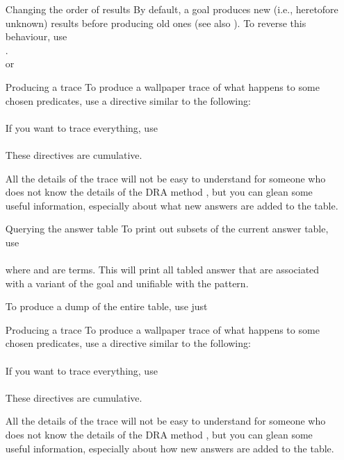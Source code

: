 \begin{itemize}
\item[Changing the order of results\label{old-first}]
  By default, a goal produces new (i.e., heretofore unknown) results before
  producing old ones (see also ).  To reverse this
  behaviour,  use\\
  \ind{}.\\
  or\\

\item[Producing a trace]
  To produce a wallpaper trace of what happens to some chosen predicates, use
  a directive similar to the following:\\
  \ind{}\\
  If you want to trace everything, use\\
  \ind{}\\
  These directives are cumulative.

  All the details of the trace will not be easy to understand for someone who
  does not know the details of the DRA method \cite{guo-gupta-dra}, but you
  can glean some useful information, especially about what new answers are
  added to the table.

\item[Querying the answer table]
To print out subsets of the current answer table, use\\
\ind{}\prog{,~}%
\\
where  and  are terms.
This will print all tabled answer that are associated with a variant of the
goal and unifiable with the pattern.

To produce a dump of the entire table, use just\\
\ind{}

\item[Producing a trace]
  To produce a wallpaper trace of what happens to some chosen predicates, use
  a directive similar to the following:\\
  \ind{}\\
  If you want to trace everything, use\\
  \ind{}\\
  These directives are cumulative.

  All the details of the trace will not be easy to understand for someone who
  does not know the details of the DRA method \cite{guo-gupta-dra}, but you
  can glean some useful information, especially about how new answers are
  added to the table.

\end{itemize}


